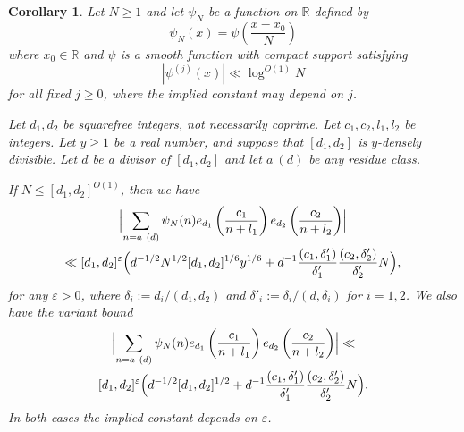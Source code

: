 \documentclass[12pt,a4paper,reqno]{amsart}
\numberwithin{equation}{section}
\theoremstyle{plain}
\newtheorem{corollary}[theorem]{Corollary}
\theoremstyle{definition}
\newcommand\R{\mathbb{R}}
\newcommand\eps{\varepsilon}
\begin{document}
\begin{corollary}\label{dons} 
  Let $N\geq 1$ and let $\psi_N$ be a function on $\R$ defined by
$$
\psi_N(x) = \psi\left(\frac{x-x_0}{N}\right)
$$
where $x_0\in \R$ and $\psi$ is a smooth function with compact support
satisfying
$$
|\psi^{(j)}(x)| \ll \log^{O(1)} N
$$
for all fixed $j \geq 0$, where the implied constant may depend on
$j$.
\par
Let $d_1,d_2$ be squarefree integers, not necessarily coprime. Let
$c_1,c_2,l_1,l_2$ be integers. Let $y\geq 1$ be a real number, and
suppose that $[d_1,d_2]$ is $y$-densely divisible.  Let $d$ be a divisor of $[d_1,d_2]$ and let $a\ (d)$ be any residue
class.
\par
If $N\leq [d_1,d_2]^{O(1)}$, then we have
\begin{multline*}
  \Bigl|\sum_{n = a\ (d)} \psi_N(n) e_{d_1}\left( \frac{c_1}{n+l_1}
  \right) e_{d_2}\left( \frac{c_2}{n+l_2}
  \right)\Bigr| \\
  \ll [d_1,d_2]^{\eps}\Bigl(d^{-1/2} N^{1/2} [d_1,d_2]^{1/6} y^{1/6} +
  d^{-1} \frac{(c_1,\delta'_1)}{\delta'_1} \frac{(c_2,\delta'_2)}{\delta'_2} N\Bigr),
\end{multline*}
for any $\eps>0$, where $\delta_i := d_i/(d_1,d_2)$ and $\delta'_i := \delta_i / (d,\delta_i)$ for $i=1,2$.  We also
have the variant bound
\begin{multline*}
  \Bigl|\sum_{n = a\ (d)} \psi_N(n) e_{d_1}\left( \frac{c_1}{n + l_1}
  \right) e_{d_2}\left( \frac{c_2}{n+l_2} \right)\Bigr| \ll\\
  [d_1,d_2]^{\eps}\Bigl(d^{-1/2} [d_1,d_2]^{1/2} + d^{-1}
  \frac{(c_1,\delta'_1)}{\delta'_1} \frac{(c_2,\delta'_2)}{\delta'_2} N\Bigr).
\end{multline*}
In both cases the implied constant depends on $\eps$.
\end{corollary}
\end{document}
